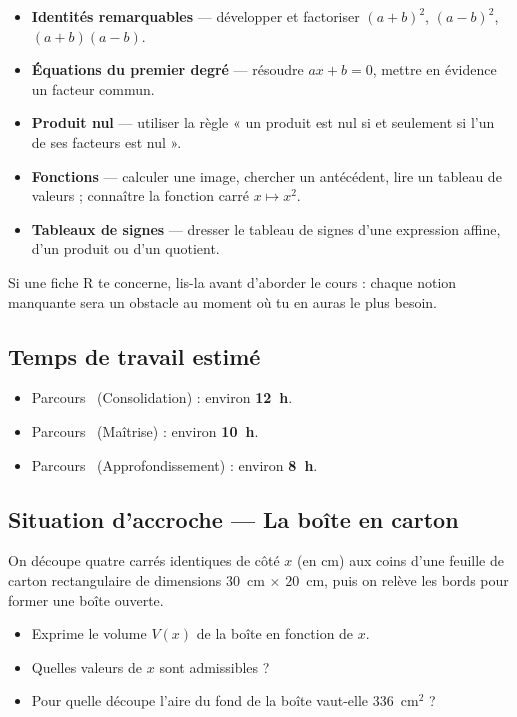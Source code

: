 \begin{itemize}
  \item[\textbf{R1}] \textbf{Identités remarquables} — développer et factoriser $(a+b)^2$, $(a-b)^2$, $(a+b)(a-b)$.
  \item[\textbf{R2}] \textbf{Équations du premier degré} — résoudre $ax + b = 0$, mettre en évidence un facteur commun.
  \item[\textbf{R3}] \textbf{Produit nul} — utiliser la règle « un produit est nul si et seulement si l'un de ses facteurs est nul ».
  \item[\textbf{R4}] \textbf{Fonctions} — calculer une image, chercher un antécédent, lire un tableau de valeurs ; connaître la fonction carré $x \mapsto x^2$.
  \item[\textbf{R5}] \textbf{Tableaux de signes} — dresser le tableau de signes d'une expression affine, d'un produit ou d'un quotient.
\end{itemize}

Si une fiche R te concerne, lis-la avant d'aborder le cours : chaque notion manquante sera un obstacle au moment où tu en auras le plus besoin.

\subsection*{Temps de travail estimé}

\begin{itemize}
  \item Parcours~\parcoursUn{} (Consolidation) : environ \textbf{12~h}.
  \item Parcours~\parcoursDeux{} (Maîtrise) : environ \textbf{10~h}.
  \item Parcours~\parcoursTrois{} (Approfondissement) : environ \textbf{8~h}.
\end{itemize}

\subsection*{Situation d'accroche — La boîte en carton}

On découpe quatre carrés identiques de côté $x$ (en cm) aux coins d'une feuille de carton rectangulaire de dimensions $30$~cm $\times$ $20$~cm, puis on relève les bords pour former une boîte ouverte.

\begin{itemize}
  \item Exprime le volume $V(x)$ de la boîte en fonction de $x$.
  \item Quelles valeurs de $x$ sont admissibles ?
  \item Pour quelle découpe l'aire du fond de la boîte vaut-elle $336$~cm$^2$ ?
\end{itemize}

